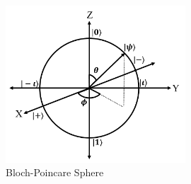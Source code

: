 \documentclass[12pt, oneside]{book}
\theoremstyle{definition}
\theoremstyle{definition}
\theoremstyle{remark}
\begin{document}
\begin{figure}[H]
    \centering
    \includegraphics[width=0.6\textwidth]{../images/bloch_sphere_dia.png}
    \caption{Bloch-Poincare Sphere}
    \label{fig:bloch_sphere}
\end{figure}
\end{document}

